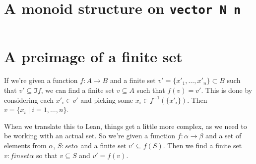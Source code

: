 \documentclass[a4paper, 12pt]{article}
\newcommand{\lean}[1]{\texttt{#1}}
\theoremstyle{changedot}
\theoremstyle{changedotbreak}
\theoremstyle{nonumberplain}
\begin{document}
\section{A monoid structure on \lean{vector N n}}\label{lean:vector_add_monoid}
\inputminted{lean}{../src/vector_add_monoid.lean}

\section{A preimage of a finite set}\label{lean:single_preimage}

If we're given a function $f : A \to B$ and a finite set $v' = \{x'_{1}, \dots, x'_{n}\} \subset B$ such that $v' \subseteq \Im f$, we can find a finite set $v \subseteq A$ such that $f(v) = v'$. This is done by considering each $x'_{i} \in v'$ and picking some $x_{i} \in f^{-1}(\{x'_{i}\})$. Then $v = \{x_{i} \mid i = 1, \dots, n\}$.

When we translate this to Lean, things get a little more complex, as we need to be working with an actual set. So we're given a function $f : \alpha \to \beta$ and a set of elements from $\alpha$, $S : set \alpha$ and a finite set $v' \subseteq f(S)$. Then we find a finite set $v : finset \alpha$ so that $v \subseteq S$ and $v' = f(v)$.

\inputminted[firstline=14, lastline=63]{lean}{../src/dickson.lean}
\end{document}
